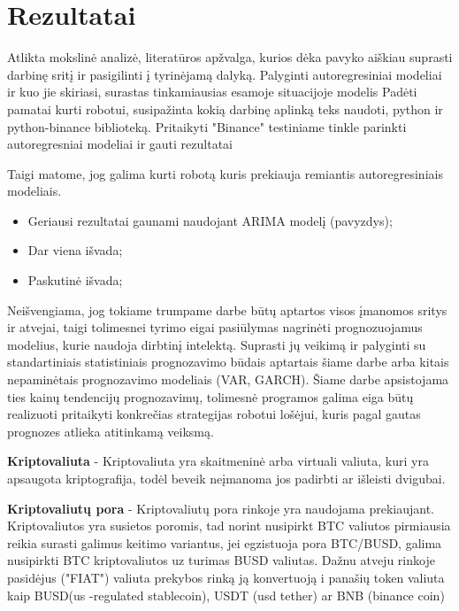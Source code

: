 \documentclass{VUMIFInfKursinis}
\begin{document}

\section{Rezultatai}
Atlikta mokslinė analizė, literatūros apžvalga, kurios dėka pavyko aiškiau suprasti darbinę sritį ir pasigilinti į 
tyrinėjamą dalyką. 
Palyginti autoregresiniai modeliai ir kuo jie skiriasi, surastas tinkamiausias esamoje situacijoje modelis
Padėti pamatai kurti robotui, susipažinta kokią darbinę aplinką teks naudoti, python ir python-binance biblioteką.
Pritaikyti "Binance" testiniame tinkle parinkti autoregresniai modeliai ir gauti rezultatai

Taigi matome, jog galima kurti robotą kuris prekiauja remiantis autoregresiniais modeliais.
\begin{itemize}
  \item Geriausi rezultatai gaunami naudojant ARIMA modelį (pavyzdys);
  \item Dar viena išvada;
  \item Paskutinė išvada;
\end{itemize}
Neišvengiama, jog tokiame trumpame darbe būtų aptartos visos įmanomos sritys ir atvejai, taigi tolimesnei tyrimo eigai pasiūlymas nagrinėti prognozuojamus modelius, 
kurie naudoja dirbtinį intelektą. Suprasti jų veikimą ir palyginti su standartiniais statistiniais prognozavimo būdais aptartais šiame darbe arba kitais nepaminėtais
prognozavimo modeliais (VAR, GARCH). Šiame darbe apsistojama ties kainų tendencijų prognozavimų, tolimesnė programos galima eiga būtų realizuoti pritaikyti konkrečias strategijas 
robotui lošėjui, kuris pagal gautas prognozes atlieka atitinkamą veiksmą.

\textbf{Kriptovaliuta} - Kriptovaliuta yra skaitmeninė arba virtuali valiuta, kuri yra apsaugota kriptografija, todėl beveik neįmanoma jos padirbti ar išleisti dvigubai.

\textbf{Kriptovaliutų pora} - Kriptovaliutų pora rinkoje yra naudojama prekiaujant. Kriptovaliutos yra susietos poromis, tad norint nusipirkt BTC valiutos pirmiausia reikia surasti 
galimus keitimo variantus, jei egzistuoja pora BTC/BUSD, galima nusipirkti BTC kriptovaliutos uz turimas BUSD valiutas. Dažnu atveju rinkoje pasidėjus ("FIAT") valiuta
prekybos rinką ją konvertuoją i panašių token valiuta kaip BUSD(us -regulated stablecoin), USDT (usd tether) ar BNB (binance coin)
\end{document}
